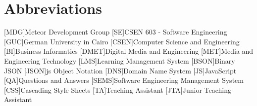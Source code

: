 \appendix
\renewcommand{\appendixtocname}{Appendix}
\renewcommand{\appendixpagename}{\appendixtocname}
\addappheadtotoc
{}
\appendixpage

\chapter{Abbreviations}

\begin{acronym}[\hspace{3cm}]
  [MDG]{Meteor Development Group}
  [SE]{CSEN 603 - Software Engineering}
  [GUC]{German University in Cairo}
  [CSEN]{Computer Science and Engineering}
  [BI]{Business Informatics}
  [DMET]{Digital Media and Engineering}
  [MET]{Media and Engineering Technology \cite{metportal}}
  [LMS]{Learning Management System}
  [BSON]{Binary JSON}
  [JSON]{\ac{js} Object Notation}
  [DNS]{Domain Name System}
  [JS]{JavaScript}
  [QA]{Questions and Answers}
  [SEMS]{Software Engineering Management System}
  [CSS]{Cascading Style Sheets}
  [TA]{Teaching Assistant}
  [JTA]{Junior Teaching Assistant}
\end{acronym}

\clearpage
\listoffigures
{}
